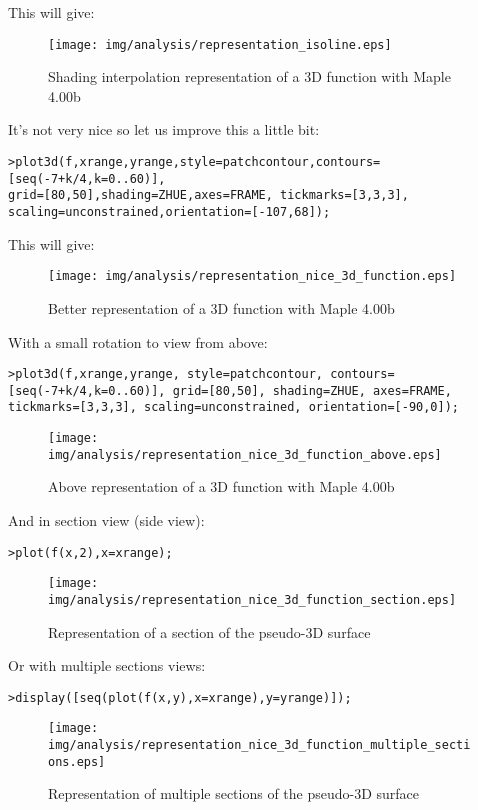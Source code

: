 This will give:

\begin{figure}[H]
\centering
\texttt{[image: img/analysis/representation\_isoline.eps]}
\caption{Shading interpolation representation of a 3D function with Maple 4.00b}
\end{figure}

It's not very nice so let us improve this a little bit:

\texttt{>plot3d(f,xrange,yrange,style=patchcontour,contours=[seq(-7+k/4,k=0..60)],\\
grid=[80,50],shading=ZHUE,axes=FRAME, tickmarks=[3,3,3],\\ scaling=unconstrained,orientation=[-107,68]);}

This will give:

\begin{figure}[H]
\centering
\texttt{[image: img/analysis/representation\_nice\_3d\_function.eps]}
\caption{Better representation of a 3D function with Maple 4.00b}
\end{figure}

With a small rotation to view from above:

\texttt{>plot3d(f,xrange,yrange, style=patchcontour, contours=[seq(-7+k/4,k=0..60)], grid=[80,50], shading=ZHUE, axes=FRAME, tickmarks=[3,3,3], scaling=unconstrained, orientation=[-90,0]);}

\begin{figure}[H]
\centering
\texttt{[image: img/analysis/representation\_nice\_3d\_function\_above.eps]}
\caption[]{Above representation of a 3D function with Maple 4.00b}
\end{figure}

And in section view (side view):

\texttt{>plot(f(x,2),x=xrange);}

\begin{figure}[H]
\centering
\texttt{[image: img/analysis/representation\_nice\_3d\_function\_section.eps]}
\caption{Representation of a section of the pseudo-3D surface}
\end{figure}

Or with multiple sections views:

\texttt{>display([seq(plot(f(x,y),x=xrange),y=yrange)]);}

\begin{figure}[H]
\centering
\texttt{[image: img/analysis/representation\_nice\_3d\_function\_multiple\_sections.eps]}
\caption{Representation of multiple sections of the pseudo-3D surface}
\end{figure}

